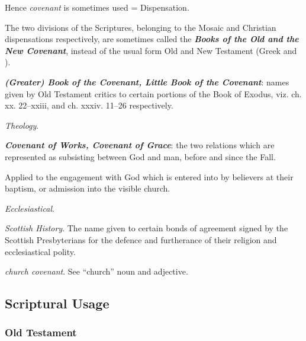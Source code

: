 \begin{compactitem}
\begin{compactitem}
				\end{compactitem}
			\item[7b] Hence \textit{covenant} is sometimes used = Dispensation.
			\item[7c] The two divisions of the Scriptures, belonging to the Mosaic and Christian dispensations respectively, are sometimes called the \textbf{\textit{Books of the Old and the New Covenant}}, instead of the usual form Old and New Testament (Greek  and  \hyperref[DIATHEKE]{}).
			\item[7d] \textbf{\textit{(Greater) Book of the Covenant, Little Book of the Covenant}}: names given by Old Testament critics to certain portions of the Book of Exodus, viz. ch. xx. 22--xxiii, and ch. xxxiv. 11--26 respectively.
			\item[8] \textit{Theology}.
			\item[8a] \textbf{\textit{Covenant of Works, Covenant of Grace}}: the two relations which are represented as subsisting between God and man, before and since the Fall.
			\item[8b] Applied to the engagement with God which is entered into by believers at their baptism, or admission into the visible church.
			\item[9] \textit{Ecclesiastical}.
			\item[9a] \textit{Scottish History}. The name given to certain bonds of agreement signed by the Scottish Presbyterians for the defence and furtherance of their religion and ecclesiastical polity.
			\item[9b] \textit{church covenant}. See ``church'' noun and adjective.
		\end{compactitem}

\subsection{Scriptural Usage} %
	\label{COVENANT-SCRIPTURES}

	\subsubsection{Old Testament} %
		\label{COVENANT-OT}
	
	
